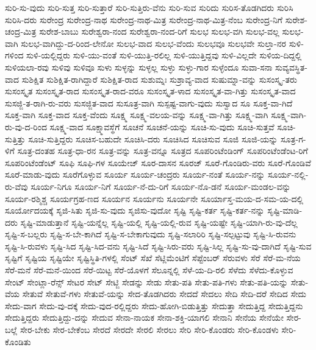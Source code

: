 {ಸುರಿ-ಸು-ವುದು
ಸುರಿ-ಸುತ್ತ
ಸುರಿ-ಸುತ್ತಾರೆ
ಸುರಿ-ಸುತ್ತಿರು-ವೆನು
ಸುರಿ-ಸುವ
ಸುರಿದು
ಸುರಿಸ-ತೊಡಗಿದರು
ಸುರಿಸಿ
ಸುರಿಸಿ-ದರು
ಸುರೇಂದ್ರ
ಸುರೇಂದ್ರ-ನಾಥ
ಸುರೇಂದ್ರ-ನಾಥ-ಮಿತ್ರ
ಸುರೇಂದ್ರ-ನಾಥ-ಮಿತ್ರ-ನೆಂಬ
ಸುರೇಂದ್ರ-ನಿಗೆ
ಸುರೇಶ-ಚಂದ್ರ-ಮಿತ್ರ
ಸುರೇಶ-ಬಾಬು
ಸುರೇಶ್ವರಾ-ನಂದ
ಸುರೇಶ್ವರಾ-ನಂದ-ರಿಗೆ
ಸುಲಭ
ಸುಲಭ-ವಗಿ
ಸುಲಭ-ವಲ್ಲ
ಸುಲಭ-ವಾಗಿ
ಸುಲಭ-ವಾಗಿದ್ದು-ದ-ರಿಂದ-ಲೇನೋ
ಸುಲಭ-ವಾದ
ಸುಲಭ-ವೆಂದು
ಸುಲಭವೂ
ಸುಲಭವೇ
ಸುಲ್ತಾ-ನರ
ಸುಳಿ-ಗಳಿಂದ
ಸುಳಿ-ಯಲ್ಲಿದ್ದರು
ಸುಳಿ-ಯು-ವಂತೆ
ಸುಳಿ-ಯುತ್ತಿ-ರಲಿಲ್ಲ
ಸುಳಿ-ಯುತ್ತಿದ್ದವು
ಸುಳಿ-ವಿಲ್ಲದೇ
ಸುಳಿಯ-ದಿದ್ದಲ್ಲಿ
ಸುಳಿಯಲಾ-ರವು
ಸುಳಿವು
ಸುಳಿವೂ
ಸುಳು
ಸುಳ್ಳನ್ನು
ಸುಳ್ಳಲ್ಲ
ಸುಳ್ಳು
ಸುಳ್ಳು-ಗಾರ
ಸುಳ್ಳೆಂದೂ
ಸುವಾ-ಸನಾ
ಸುವ್ಯವಸ್ಥಿತ-ವಾದ
ಸುಶಿಕ್ಷಿತ
ಸುಶಿಕ್ಷಿತ-ರಾಗಿದ್ದಾರೆ
ಸುಶಿಕ್ಷಿತ-ರಾದ
ಸುಶುಮ್ನಃ
ಸುಶ್ರಾವ್ಯ-ವಾದ
ಸುಷುಮ್ನಾ-ವನ್ನು
ಸುಸಂಸ್ಕೃ-ತರು
ಸುಸಂಸ್ಕೃತ
ಸುಸಂಸ್ಕೃತ-ರಾದ
ಸುಸಂಸ್ಕೃತ-ರಾದ-ವರೂ
ಸುಸಂಸ್ಕೃತ-ಳಾದ
ಸುಸಂಸ್ಕೃತ-ವಾ-ಗಿತ್ತು
ಸುಸಂಸ್ಕೃತ-ವಾದ
ಸುಸಜ್ಜಿ-ತ-ರಾಗಿ-ರು-ವರು
ಸುಸಜ್ಜಿತ-ವಾದ
ಸುಸೂತ್ರ-ವಾಗಿ
ಸುಸ್ಪಷ್ಟ-ವಾಗು-ವುದು
ಸುಸ್ವಾದ
ಸೂ
ಸೂಕ್ತ-ವಾ-ಗಿದೆ
ಸೂಕ್ತ-ವಾಗಿ
ಸೂಕ್ತ-ವಾದ
ಸೂಕ್ತ-ವೆಂದು
ಸೂಕ್ಷ್ಮ
ಸೂಕ್ಷ್ಮ-ವಲಯ-ವನ್ನು
ಸೂಕ್ಷ್ಮ-ವಾ-ಗಿತ್ತು
ಸೂಕ್ಷ್ಮ-ವಾಗಿ
ಸೂಕ್ಷ್ಮ-ವಾಗಿ-ರು-ವು-ದ-ರಿಂದ
ಸೂಕ್ಷ್ಮ-ವಾದ
ಸೂಕ್ಷ್ಮಾವಸ್ಥೆಗೆ
ಸೂಚನೆ
ಸೂಚನೆ-ಯನ್ನು
ಸೂಚಿ-ಸು-ವುದು
ಸೂಚಿ-ಸುತ್ತವೆ
ಸೂಚಿ-ಸುತ್ತಿತ್ತು
ಸೂಚಿ-ಸುತ್ತಿದ್ದರು
ಸೂಚಿಸ-ಬಹುದೇ
ಸೂಚಿಸಿ-ದರು
ಸೂಚಿಸಿದ
ಸೂಚಿಸುವ
ಸೂಜಿ
ಸೂಜಿ-ಯನ್ನು
ಸೂತ್ರ-ಗ-ಳಿಗೆ
ಸೂತ್ರ-ದಂತಹ
ಸೂತ್ರ-ಧಾ-ರನ
ಸೂತ್ರ-ವನ್ನು
ಸೂತ್ರ-ವನ್ನೂ
ಸೂತ್ರದ
ಸೂಪರಿಂಟೆಂಡಿಂಗ್
ಸೂಪರಿಂಟೆಂಡೆಂಟ-ರಿಗೆ
ಸೂಪರಿಂಟೆಂಡೆಂಟ್
ಸೂಫಿ
ಸೂಫಿ-ಗಳ
ಸೂಯೇಜ್
ಸೂರ-ದಾಸನ
ಸೂರಜ್
ಸೂರೆ-ಗೊಂಡಿರು-ವರು
ಸೂರೆ-ಗೊಂಡಿವೆ
ಸೂರೆ-ಮಾಡು-ವುದು
ಸೂರೆಗೊಳ್ಳುವ
ಸೂರ್ಯ
ಸೂರ್ಯ-ಚಂದ್ರರು
ಸೂರ್ಯ-ನಂತೆ
ಸೂರ್ಯ-ನನ್ನು
ಸೂರ್ಯ-ನಲ್ಲಿ-ರು-ವೆವು
ಸೂರ್ಯ-ನಿಗೂ
ಸೂರ್ಯ-ನಿಗೆ
ಸೂರ್ಯ-ನೆ-ದು-ರಿಗೆ
ಸೂರ್ಯ-ನೊ-ಡನೆ
ಸೂರ್ಯ-ಮಂಡಲ-ವನ್ನು
ಸೂರ್ಯ-ರಶ್ಮಿಶ್ಚ
ಸೂರ್ಯಗ್ರಹ-ಣದ
ಸೂರ್ಯನ
ಸೂರ್ಯನು
ಸೂರ್ಯನೇ
ಸೂರ್ಯಾಸ್ತ-ಮಯ-ದ-ಸಮ-ಯ-ದಲ್ಲಿ
ಸೂರ್ಯೋದಯಕ್ಕೆ
ಸೃಜಿ-ಸಿತು
ಸೃಜಿ-ಸು-ವುದು
ಸೃಜಿಸು-ವುದೋ
ಸೃಷ್ಟಿ
ಸೃಷ್ಟಿ-ಕರ್ತ
ಸೃಷ್ಟಿ-ಕರ್ತ-ನನ್ನು
ಸೃಷ್ಟಿ-ಮಾಡಿ-ದರು
ಸೃಷ್ಟಿ-ಮಾಡುತ್ತಾನೆ
ಸೃಷ್ಟಿ-ಯನ್ನೆಲ್ಲ
ಸೃಷ್ಟಿ-ಯಲ್ಲಿ
ಸೃಷ್ಟಿ-ಯಲ್ಲಿ-ರುವ
ಸೃಷ್ಟಿ-ಯಷ್ಟೇ
ಸೃಷ್ಟಿ-ಯಾಗಿ-ರು-ವು-ದೆಲ್ಲ
ಸೃಷ್ಟಿ-ಸ-ಬಲ್ಲರು
ಸೃಷ್ಟಿ-ಸ-ಬೇ-ಕಾಗಿದೆ
ಸೃಷ್ಟಿ-ಸ-ಬೇಕಾಗುವುದು
ಸೃಷ್ಟಿ-ಸಲಾರಿರಿ
ಸೃಷ್ಟಿ-ಸಲ್ಪಟ್ಟುವು
ಸೃಷ್ಟಿ-ಸಿ-ರುವನು
ಸೃಷ್ಟಿ-ಸಿ-ರುವಳು
ಸೃಷ್ಟಿ-ಸಿದ
ಸೃಷ್ಟಿ-ಸಿದ-ವನು
ಸೃಷ್ಟಿ-ಸಿದೆ
ಸೃಷ್ಟಿ-ಸಿರು-ವರು
ಸೃಷ್ಟಿ-ಸಿಲ್ಲ
ಸೃಷ್ಟಿ-ಸು-ವು-ದಾಗಿದೆ
ಸೃಷ್ಟಿ-ಸುವ
ಸೃಷ್ಟಿಗೆ
ಸೃಷ್ಟಿಯ
ಸೃಷ್ಟಿಯೇ
ಸೃಷ್ಟಿಸ್ಥಿತಿ-ಗಳಲ್ಲಿ
ಸೆಂಟ್
ಸೆಖೆ
ಸೆಟ್ಲಿಮೆಂಟಿಗೆ
ಸೆಪ್ಟೆಂಬರ್
ಸೆರುವಳು
ಸೆರೆ
ಸೆರೆ-ಮ-ನೆಯ
ಸೆರೆ-ಮನೆ
ಸೆರೆ-ಮನೆ-ಯಿಂದ
ಸೆರೆ-ಯಿಟ್ಟ
ಸೆರೆ-ಯೊಳಗೆ
ಸೆಲೂನ್ನಲ್ಲಿ
ಸೆಳೆ-ಯ-ದಿ-ರಲಿ
ಸೆಳೆದು
ಸೆಳೆದು-ಕೊಳ್ಳುವ
ಸೇಂಟ್
ಸೇಂಟ್ಲಾ-ರೆನ್ಸ್
ಸೇಟರ
ಸೇಟ್
ಸೇಟ್ಜಿ
ಸೇಡನ್ನು
ಸೇಡು
ಸೇತು-ಪತಿ
ಸೇತು-ಪತಿ-ಗಳು
ಸೇತು-ಪತಿ-ಯನ್ನು
ಸೇತು-ವೆಯ
ಸೇತುವೆ
ಸೇತುವೆ-ಗಳು
ಸೇತುವೆ-ಯನ್ನು
ಸೇದ-ತೊಡಗಿದರು
ಸೇದದೆ
ಸೇದಲು
ಸೇದಿ
ಸೇದಿ-ದರೆ
ಸೇದಿದ
ಸೇದು
ಸೇದು-ವಾಗ
ಸೇದು-ವು-ದಕ್ಕೆ
ಸೇದು-ವುದ-ರಲ್ಲಿದ್ದರು
ಸೇದು-ಹೋಗಿ-ಬಿಡುತ್ತಿತ್ತು
ಸೇದುತ್ತಾ
ಸೇದುತ್ತಿದ್ದ
ಸೇದುತ್ತಿದ್ದನು
ಸೇದುತ್ತಿದ್ದರು
ಸೇದುತ್ತಿದ್ದು-ದನ್ನು
ಸೇದುವ
ಸೇನಾ-ನಾಯಕ
ಸೇನಾ-ಶಕ್ತಿ-ಯಾಗಲಿ
ಸೇನಾನಿ
ಸೇನೆಯ
ಸೇನೆಯೇ
ಸೇರ-ಬಲ್ಲೆ
ಸೇರ-ಬೇಕು
ಸೇರ-ಬೇಕೆಂಬ
ಸೇರದೆ
ಸೇರದೇ
ಸೇರಲಿ
ಸೇರಲು
ಸೇರಿ
ಸೇರಿ-ಕೊಂಡರು
ಸೇರಿ-ಕೊಂಡಳು
ಸೇರಿ-ಕೊಂಡಿತು
}
